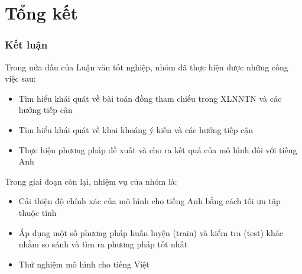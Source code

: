 \documentclass{beamer}
\begin{document}
\section{Tổng kết}
\begin{frame}
\frametitle{Kết luận}

Trong nửa đầu của Luận văn tốt nghiệp, nhóm đã thực hiện được những công việc sau:
\begin{itemize}
\item Tìm hiểu khái quát về bài toán đồng tham chiếu trong XLNNTN và các hướng tiếp cận
\item Tìm hiểu khái quát về khai khoáng ý kiến và các hướng tiếp cận
\item Thực hiện phương pháp đề xuất và cho ra kết quả của mô hình đối với tiếng Anh
\end{itemize}

Trong giai đoạn còn lại, nhiệm vụ của nhóm là:

\begin{itemize}
\item Cải thiện độ chính xác của mô hình cho tiếng Anh bằng cách tối ưu tập thuộc tính
\item Áp dụng một số phương pháp huấn luyện (train) và kiểm tra (test) khác nhằm so sánh và tìm ra phương pháp tốt nhất
\item Thử nghiệm mô hình cho tiếng Việt
\end{itemize}

\end{frame}
\end{document}
